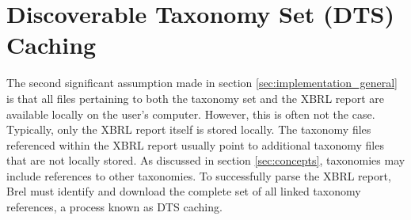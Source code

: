 
\section{Discoverable Taxonomy Set (DTS) Caching}
\label{sec:implementation_dts_cache}

The second significant assumption made in section \ref{sec:implementation_general} is that all files pertaining to both the taxonomy set and the XBRL report are available locally on the user's computer. 
However, this is often not the case. 
Typically, only the XBRL report itself is stored locally. 
The taxonomy files referenced within the XBRL report usually point to additional taxonomy files that are not locally stored. 
As discussed in section \ref{sec:concepts}, taxonomies may include references to other taxonomies. 
To successfully parse the XBRL report, Brel must identify and download the complete set of all linked taxonomy references, a process known as DTS caching.



